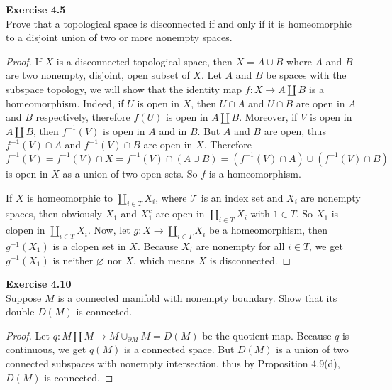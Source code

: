 \documentclass[12pt, a4paper]{article}
\theoremstyle{plain}
\newcommand{\T}{\mathcal{T}}
\newenvironment{exercise}[2][Exercise]
    { \begin{mdframed}[backgroundcolor=gray!20] \textbf{#1 #2} \\}
    {  \end{mdframed}}
\begin{document}
\begin{exercise}{4.5}
Prove that a topological space is disconnected if and only if it is homeomorphic to a disjoint union of two or more nonempty spaces.
\end{exercise}
	\begin{proof}
	If $X$ is a disconnected topological space, then $X=A\cup B$ where $A$ and $B$ are two nonempty, disjoint, open subset of $X$. Let $A$ and $B$ be spaces with the subspace topology, we will show that the identity map $f:X\rightarrow A\coprod B$ is a homeomorphism. Indeed, if $U$ is open in $X$, then $U\cap A$ and $U\cap B$ are open in $A$ and $B$ respectively, therefore $f(U)$ is open in $A\coprod B$. Moreover, if $V$ is open in $A\coprod B$, then $f^{-1}(V)$ is open in $A$ and in $B$. But $A$ and $B$ are open, thus $f^{-1}(V)\cap A$ and $f^{-1}(V)\cap B$ are open in $X$. Therefore 
	\[
	f^{-1}(V) = f^{-1}(V)\cap X=f^{-1}(V)\cap (A\cup B)=(f^{-1}(V)\cap A)\cup (f^{-1}(V)\cap B)
	\]
	is open in $X$ as a union of two open sets. So $f$ is a homeomorphism.
	
	If $X$ is homeomorphic to $\coprod_{i\in T}X_i$, where $\T$ is an index set and $X_i$ are nonempty spaces, then obviously $X_1$ and $X_1^c$ are open in $\coprod_{i\in T}X_i$ with $1\in T$. So $X_1$ is clopen in $\coprod_{i\in T}X_i$. Now, let $g:X\rightarrow \coprod_{i\in T}X_i$ be a homeomorphism, then $g^{-1}(X_1)$ is a clopen set in $X$. Because $X_i$ are nonempty for all $i\in T$, we get $g^{-1}(X_1)$ is neither $\varnothing$ nor $X$, which means $X$ is disconnected.
	\end{proof}
	
\begin{exercise}{4.10}
Suppose $M$ is a connected manifold with nonempty boundary. Show that its double $D(M)$ is connected.
\end{exercise}
	\begin{proof}
	Let $q:M\coprod M\rightarrow M\cup_{\partial M}M=D(M)$ be the quotient map. Because $q$ is continuous, we get $q(M)$ is a connected space. But $D(M)$ is a union of two connected subspaces with nonempty intersection, thus by Proposition 4.9(d), $D(M)$ is connected.
	\end{proof}
	
\end{document}
